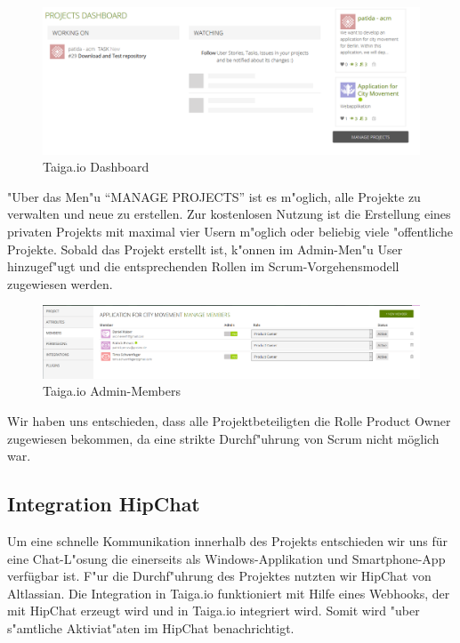 \documentclass[a4paper, 11pt]{scrreprt}
\begin{document}
\begin{figure} [H]
\begin{center}


\includegraphics[width=16cm]{dashboard.png}
\caption{Taiga.io Dashboard}

\end{center}
\end{figure}

"Uber das Men"u "`MANAGE PROJECTS"' ist es m"oglich, alle Projekte zu verwalten und neue zu erstellen. Zur kostenlosen Nutzung ist die Erstellung eines privaten Projekts mit maximal vier Usern m"oglich oder beliebig viele "offentliche Projekte. Sobald das Projekt erstellt ist, k"onnen im Admin-Men"u User hinzugef"ugt und die entsprechenden Rollen im Scrum-Vorgehensmodell zugewiesen werden.

\begin{figure} [H]
\begin{center}


\includegraphics[width=16cm]{members.png}
\caption{Taiga.io Admin-Members}

\end{center}
\end{figure}

Wir haben uns entschieden, dass alle Projektbeteiligten die Rolle Product Owner zugewiesen bekommen, da eine strikte Durchf"uhrung von Scrum nicht möglich war.

\subsection{Integration HipChat}

Um eine schnelle Kommunikation innerhalb des Projekts entschieden wir uns für eine Chat-L"osung die einerseits als Windows-Applikation und Smartphone-App verfügbar ist. F"ur die Durchf"uhrung des Projektes nutzten wir HipChat von Altlassian. Die Integration in Taiga.io funktioniert mit Hilfe eines Webhooks, der mit HipChat erzeugt wird und in Taiga.io integriert wird. Somit wird "uber s"amtliche Aktiviat"aten im HipChat benachrichtigt.
\end{document}
